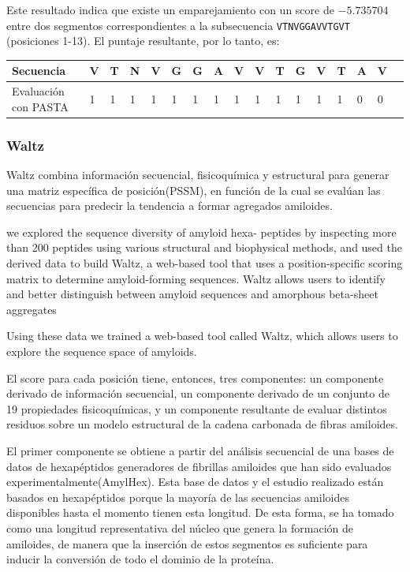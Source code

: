 Este resultado indica que existe un emparejamiento con un score de $-5.735704$ entre dos segmentos correspondientes a la subsecuencia \texttt{VTNVGGAVVTGVT} (posiciones 1-13). 
El puntaje resultante, por lo tanto, es:

\vspace{0.5cm}
\noindent
\begin{tabular}{lllllllllllllllll} 
\hline    
Secuencia & \textbf{V} & \textbf{T} & \textbf{N} & \textbf{V} & \textbf{G} & \textbf{G} & \textbf{A} & \textbf{V} & \textbf{V} &\textbf{T} & \textbf{G} & \textbf{V} & \textbf{T} & \textbf{A} & \textbf{V} \\ \hline
Evaluación con PASTA & 1 & 1 & 1 & 1 & 1 & 1 & 1 & 1 & 1 & 1 & 1 & 1 & 1 & 0 & 0 \\ \hline
\end{tabular}





\subsubsection{Waltz}\label{waltz}

Waltz \cite{maurer2010exploring} combina información secuencial, fisicoquímica y estructural para generar una matriz específica de posición(PSSM),
en función de la cual se evalúan las secuencias para predecir la tendencia a formar agregados amiloides.

we explored the sequence diversity of amyloid hexa-
peptides by inspecting more than 200 peptides using various
structural and biophysical methods,
and used the derived data to build Waltz, a
web-based tool that uses a position-specific scoring matrix to
determine amyloid-forming sequences. Waltz allows users to
identify and better distinguish between amyloid sequences
and amorphous beta-sheet aggregates

 Using these data we trained
a web-based tool called Waltz, which allows users to explore the
sequence space of amyloids.

El score para cada posición tiene, entonces, tres componentes: un componente derivado de información secuencial, un componente derivado de un conjunto de 19 propiedades fisicoquímicas, 
y un componente resultante de evaluar distintos residuos sobre un modelo estructural de la cadena carbonada de fibras amiloides.

El primer componente se obtiene a partir del análisis secuencial de una bases de datos de hexapéptidos generadores de fibrillas amiloides que han sido evaluados experimentalmente(AmylHex).
Esta base de datos y el estudio realizado están basados en hexapéptidos porque la mayoría de las secuencias amiloides disponibles hasta el momento tienen esta longitud.
De esta forma, se ha tomado como una longitud representativa del núcleo que genera la formación de amiloides, de manera que
la inserción de estos segmentos es suficiente para inducir la conversión de todo el dominio de la proteína. 


